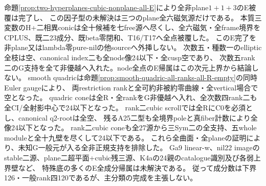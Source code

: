 \documentclass[a4paper,11pt]{ltjsarticle}
\theoremstyle{definition}
\begin{document}
命題\ref{prop:two-hyperplanes-cubic-nonplane-all-E}により全非plane$1+1+3$のE被覆は完了し、
この因子型の未解決は三つのplane全六磁気源だけである。
本質三変数のH+二相異conicは全十候補を七free源へ尽くし、全六磁気・全frame境界を
CPLUS、既二23成分、既beta零閉和、T16/T17へ全点被覆した。
このE完了を非plane又はlambda零pure-nilの他sourceへ外挿しない。
次数五・種数一のelliptic全枝は空、canonical index二も全node像24以下・全cusp空であり、
次数五rank二のG支持を全て非優越へ入れた。node全点のE帰属はこの次元上界から結論しない。
smooth quadricは命題\ref{prop:smooth-quadric-all-ranks-all-R-empty}の同時Euler gaugeにより、
両restriction rankと全可約非被約零曲線・全vertical場合で空となった。
quadric coneは全R・全rankをG非優越へ入れ、全次数四rank二も全CI/全射影中心で24以下となった。
rank二cubic scrollでは全RにC0を必須とし、canonical q2-rootは全空、
残るA25二型も全境界poleと真fiber計数により全像24以下となった。
rank二cubic coneも全27源から三Sym二の全支持、五whole moduleと全十九壁を尽くして24以下である。
これら全曲面・全planeの証明により、未知G一般元が入る全非正規支持を排除した。
Ga9 linear-w、nil22 imageのstable二源、plane二超平面+cubic残三源、K4aの24親のcatalogue識別及び各弱上界壁など、
特殊底の多くのE全成分帰属は未解決である。
従って成分数は下界126・一般rank四120であるが、主分類の完成を主張しない。
\end{document}
